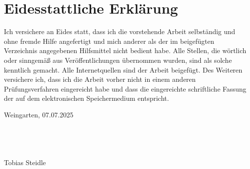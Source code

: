 \documentclass[12pt, ngerman, a4paper, numbers=noenddot]{article}
\begin{document}


\newpage
\hypersetup{pageanchor=true}
\renewcommand{\thepage}{\Roman{page}}


\newpage
\section*{Eidesstattliche Erklärung}
Ich versichere an Eides statt, dass ich die vorstehende Arbeit selbständig und ohne fremde Hilfe angefertigt und mich anderer als der im beigefügten Verzeichnis angegebenen Hilfsmittel nicht bedient habe. Alle Stellen, die wörtlich oder sinngemäß aus Veröffentlichungen übernommen wurden, sind als solche kenntlich gemacht. Alle Internetquellen sind der Arbeit beigefügt. Des Weiteren versichere ich, dass ich die Arbeit vorher nicht in einem anderen Prüfungsverfahren eingereicht habe und dass die eingereichte schriftliche Fassung der auf dem elektronischen Speichermedium entspricht.\\
\begin{flushleft}
	Weingarten, 07.07.2025
	\ \\
	\ \\
	\ \\
	\ \\
	\ \\
	Tobias Steidle
\end{flushleft}

\newpage
\tableofcontents{}

%
%
%
%
%
%
%
%
%
\end{document}
